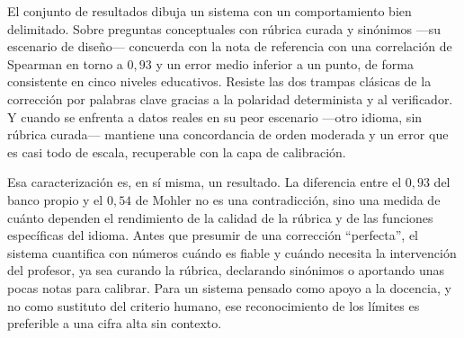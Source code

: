 El conjunto de resultados dibuja un sistema con un comportamiento bien delimitado. Sobre preguntas conceptuales con rúbrica curada y sinónimos —su escenario de diseño— concuerda con la nota de referencia con una correlación de Spearman en torno a $0{,}93$ y un error medio inferior a un punto, de forma consistente en cinco niveles educativos. Resiste las dos trampas clásicas de la corrección por palabras clave gracias a la polaridad determinista y al verificador. Y cuando se enfrenta a datos reales en su peor escenario —otro idioma, sin rúbrica curada— mantiene una concordancia de orden moderada y un error que es casi todo de escala, recuperable con la capa de calibración.

Esa caracterización es, en sí misma, un resultado. La diferencia entre el $0{,}93$ del banco propio y el $0{,}54$ de Mohler no es una contradicción, sino una medida de cuánto dependen el rendimiento de la calidad de la rúbrica y de las funciones específicas del idioma. Antes que presumir de una corrección ``perfecta'', el sistema cuantifica con números cuándo es fiable y cuándo necesita la intervención del profesor, ya sea curando la rúbrica, declarando sinónimos o aportando unas pocas notas para calibrar. Para un sistema pensado como apoyo a la docencia, y no como sustituto del criterio humano, ese reconocimiento de los límites es preferible a una cifra alta sin contexto.
